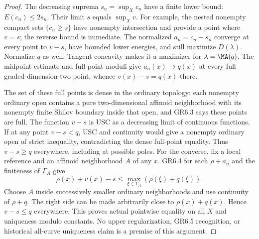 \begin{proof}
The decreasing suprema $s_n=\sup_Xc_n$ have a finite lower bound:
$E(c_n)\le2s_n$. Their limit $s$ equals $\sup_Xv$. For example,
the nested nonempty compact sets $\{c_n\ge s\}$ have nonempty
intersection and provide a point where $v=s$; the reverse bound is
immediate. The normalized $a_n=c_n-s_n$ converge at every point to
$v-s$, have bounded lower energies, and still maximize $D(\lambda)$.
Normalize $q$ as well. Tangent concavity makes it a maximizer for
$\lambda=\MA(q)$. The midpoint estimate and full-point moduli give
$a_n(x)\to q(x)$ at every full graded-dimension-two point, whence
$v(x)-s=q(x)$ there.

The set of these full points is dense in the ordinary topology:
each nonempty ordinary open contains a pure two-dimensional affinoid
neighborhood with its nonempty finite Shilov boundary inside that
open, and GR6.3 says these points are full. The function $v-s$ is
USC as a decreasing limit of continuous functions. If at any point
$v-s<q$, USC and continuity would give a nonempty ordinary open of
strict inequality, contradicting the dense full-point equality.
Thus $v-s\ge q$ everywhere, including at possible poles.
For the converse, fix a local reference and an affinoid neighborhood
$A$ of any $x$. GR6.4 for each $\rho+a_n$ and the finiteness of
$\Gamma_A$ give
\[
 \rho(x)+v(x)-s\le
 \max_{\xi\in\Gamma_A}(\rho(\xi)+q(\xi)).
\]
Choose $A$ inside successively smaller ordinary neighborhoods and use
continuity of $\rho+q$. The right side can be made arbitrarily close
to $\rho(x)+q(x)$. Hence $v-s\le q$ everywhere. This proves actual
pointwise equality on all $X$ and uniqueness modulo constants.
No upper regularization, GR6.5 recognition, or historical all-curve
uniqueness claim is a premise of this argument.
\end{proof}

